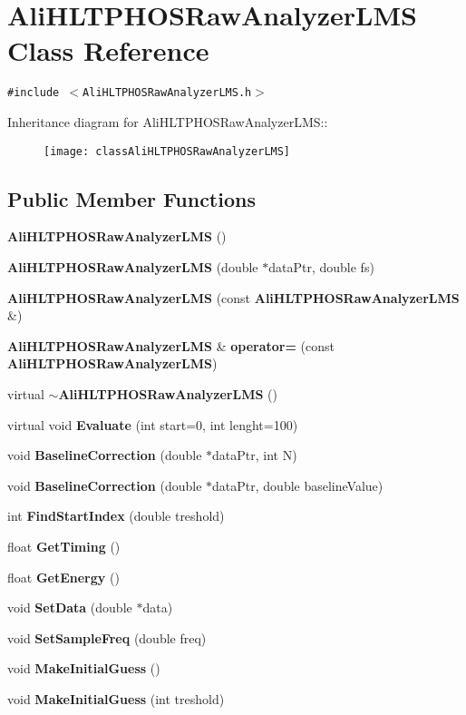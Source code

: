 \section{Ali\-HLTPHOSRaw\-Analyzer\-LMS Class Reference}
\label{classAliHLTPHOSRawAnalyzerLMS}
{\tt \#include $<$Ali\-HLTPHOSRaw\-Analyzer\-LMS.h$>$}

Inheritance diagram for Ali\-HLTPHOSRaw\-Analyzer\-LMS::\begin{figure}[H]
\begin{center}
\leavevmode
\texttt{[image: classAliHLTPHOSRawAnalyzerLMS]}
\end{center}
\end{figure}
\subsection*{Public Member Functions}
\begin{CompactItemize}
\item 
{\bf Ali\-HLTPHOSRaw\-Analyzer\-LMS} ()
\item 
{\bf Ali\-HLTPHOSRaw\-Analyzer\-LMS} (double $\ast$data\-Ptr, double fs)
\item 
{\bf Ali\-HLTPHOSRaw\-Analyzer\-LMS} (const {\bf Ali\-HLTPHOSRaw\-Analyzer\-LMS} \&)
\item 
{\bf Ali\-HLTPHOSRaw\-Analyzer\-LMS} \& {\bf operator=} (const {\bf Ali\-HLTPHOSRaw\-Analyzer\-LMS})
\item 
virtual {\bf $\sim$Ali\-HLTPHOSRaw\-Analyzer\-LMS} ()
\item 
virtual void {\bf Evaluate} (int start=0, int lenght=100)
\item 
void {\bf Baseline\-Correction} (double $\ast$data\-Ptr, int N)
\item 
void {\bf Baseline\-Correction} (double $\ast$data\-Ptr, double baseline\-Value)
\item 
int {\bf Find\-Start\-Index} (double treshold)
\item 
float {\bf Get\-Timing} ()
\item 
float {\bf Get\-Energy} ()
\item 
void {\bf Set\-Data} (double $\ast$data)
\item 
void {\bf Set\-Sample\-Freq} (double freq)
\item 
void {\bf Make\-Initial\-Guess} ()
\item 
void {\bf Make\-Initial\-Guess} (int treshold)
\end{CompactItemize}
